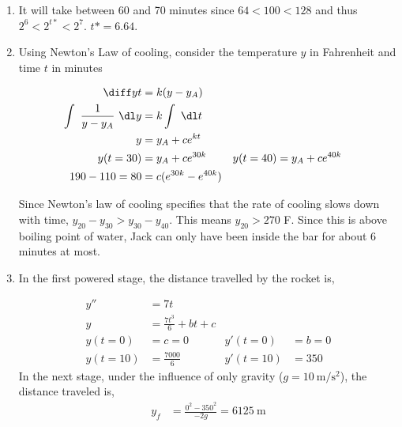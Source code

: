 \begin{enumerate}
    \item It will take between 60 and 70 minutes since $ 64 < 100 < 128 $ and
          thus $ 2^{6} < 2^{t*} < 2^{7} $. $ t* = 6.64$.

    \item Using Newton's Law of cooling, consider the temperature $ y $ in
          Fahrenheit and time $ t $ in minutes

          \begin{align}
              \diff yt                         & = k(y - y_{A})           \\
              \int\ \frac{1}{y - y_{A}}\ \dl y & = k \int\ \dl t          \\
              y                                & = y_{A} + c e^{kt}       \\
              y(t = 30)                        & = y_{A} + ce^{30k}     &
              y(t = 40)                        & =y_{A} + ce^{40k}        \\
              190 - 110 = 80                   & = c(e^{30k} - e^{40k})
          \end{align}


          Since Newton's law of cooling specifies that the rate of cooling slows down
          with time, $ y_{20} - y_{30} > y_{30} - y_{40}$.
          This means $ y_{20} > 270$ F. Since this is above boiling point of water,
          Jack can only have been inside the bar for about 6 minutes at
          most.

    \item In the first powered stage, the distance travelled by the rocket is,

          \begin{align}
              y''       & = 7t                                               \\
              y         & = \frac{7t^{3}}{6} + bt + c                        \\
              y(t = 0)  & = c = 0                     & y'(t=0)    & = b = 0 \\
              y(t = 10) & = \frac{7000}{6}            & y'(t = 10) & = 350
          \end{align}
          In the next stage, under the influence of only gravity
          ($ g = \SI{10}{\meter\per\second\squared} $), the distance traveled is,
          \begin{align}
              y_{f} & = \frac{0^{2} - 350^{2}}{-2g} = \SI{6125}{\meter}
          \end{align}



\end{enumerate}
